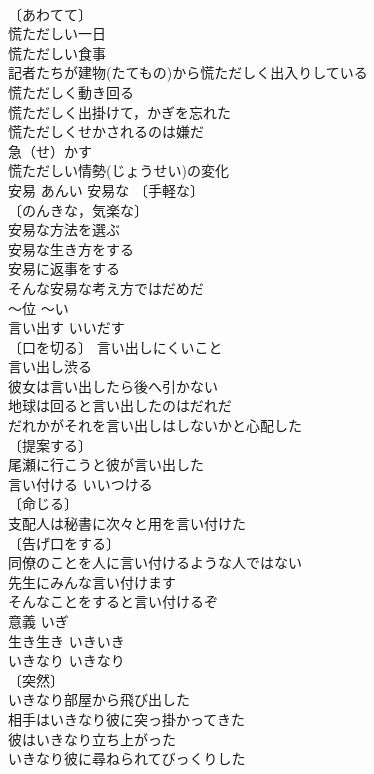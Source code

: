 \documentclass[8pt]{extreport}
\begin{document}
\begin{CJK}{UTF8}{min}
\\	〔あわてて〕
\\	慌ただしい一日 
\\	慌ただしい食事 
\\	記者たちが建物(たてもの)から慌ただしく出入りしている 
\\	慌ただしく動き回る 
\\	慌ただしく出掛けて，かぎを忘れた 
\\	慌ただしくせかされるのは嫌だ 
\\	急（せ）かす　
\\	慌ただしい情勢(じょうせい)の変化 
\\	安易	あんい	安易な 〔手軽な〕
\\	〔のんきな，気楽な〕
\\	安易な方法を選ぶ 
\\	安易な生き方をする 
\\	安易に返事をする 
\\	そんな安易な考え方ではだめだ 
\\	～位	～い	
\\	言い出す	いいだす	
\\	〔口を切る〕 言い出しにくいこと 
\\	言い出し渋る 
\\	彼女は言い出したら後へ引かない 
\\	地球は回ると言い出したのはだれだ 
\\	だれかがそれを言い出しはしないかと心配した 
\\	〔提案する〕
\\	尾瀬に行こうと彼が言い出した 
\\	言い付ける	いいつける	
\\	〔命じる〕
\\	支配人は秘書に次々と用を言い付けた 
\\	〔告げ口をする〕
\\	同僚のことを人に言い付けるような人ではない 
\\	先生にみんな言い付けます 
\\	そんなことをすると言い付けるぞ 
\\	意義	いぎ	
\\	生き生き	いきいき	
\\	いきなり	いきなり	
\\	〔突然〕
\\	いきなり部屋から飛び出した 
\\	相手はいきなり彼に突っ掛かってきた 
\\	彼はいきなり立ち上がった 
\\	いきなり彼に尋ねられてびっくりした 

\end{CJK}
\end{document}
